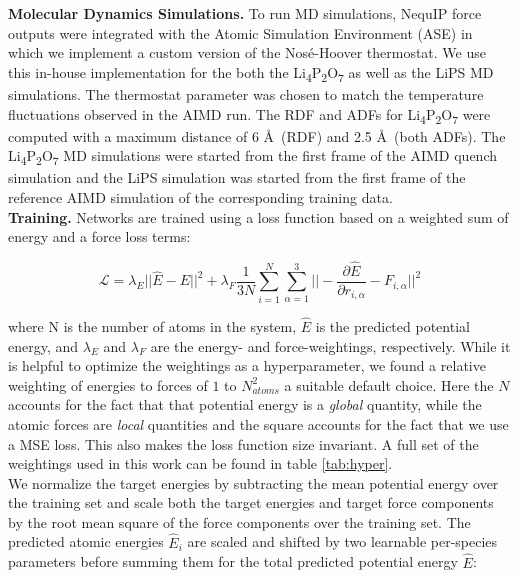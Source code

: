 \documentclass[%
reprint,
superscriptaddress,
nofootinbib,
amsmath,amssymb,
aps,
prl,
]{revtex4-1}
\begin{document}
\textbf{Molecular Dynamics Simulations.} To run MD simulations, NequIP force outputs were integrated with the Atomic Simulation Environment (ASE) \cite{Hjorth_Larsen_2017} in which we implement a custom version of the Nosé-Hoover thermostat. We use this in-house implementation for the both the Li\textsubscript{4}P\textsubscript{2}O\textsubscript{7} as well as the LiPS MD simulations. The thermostat parameter was chosen to match the temperature fluctuations observed in the AIMD run. The RDF and ADFs for Li\textsubscript{4}P\textsubscript{2}O\textsubscript{7} were computed with a maximum distance of 6 \AA \ (RDF) and 2.5 \AA \ (both ADFs). The Li\textsubscript{4}P\textsubscript{2}O\textsubscript{7} MD simulations were started from the first frame of the AIMD quench simulation and the LiPS simulation was started from the first frame of the reference AIMD simulation of the corresponding training data.\\


\textbf{Training.} Networks are trained using a loss function based on a weighted sum of energy and a force loss terms:

\begin{equation}
    \mathcal{L} = \lambda_E || \hat{E} - E||^2 + \lambda_F \frac{1}{3N} \sum_{i=1}^{N} \sum_{\alpha=1}^3 || -\frac{\partial \hat{E}}{\partial r_{i, \alpha}}  - F_{i, \alpha}||^2
\end{equation}

where N is the number of atoms in the system, $\hat{E}$ is the predicted potential energy, and $\lambda_E$ and $\lambda_F$ are the energy- and force-weightings, respectively. While it is helpful to optimize the weightings as a hyperparameter, we found a relative weighting of energies to forces of $1$ to $N_{atoms}^2$ a suitable default choice. Here the $N$ accounts for the fact that that potential energy is a \emph{global} quantity, while the atomic forces are \emph{local} quantities and the square accounts for the fact that we use a MSE loss. This also makes the loss function size invariant. A full set of the weightings used in this work can be found in table \ref{tab:hyper}. \\ 

We normalize the target energies by subtracting the mean potential energy over the training set and scale both the target energies and target force components by the root mean square of the force components over the training set. The predicted atomic energies $\hat{E}_i$ are scaled and shifted by two learnable per-species parameters before summing them for the total predicted potential energy $\hat{E}$: 
\end{document}

